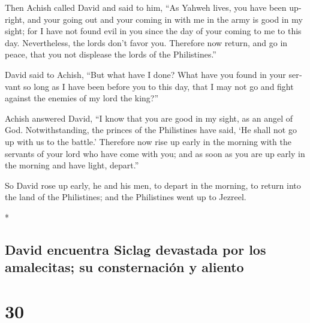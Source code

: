 \begin{paracol}{2}
\begin{otherlanguage}{english}
 Then Achish called David and said to him, ``As Yahweh
lives, you have been upright, and your going out and your coming in with
me in the army is good in my sight; for I have not found evil in you
since the day of your coming to me to this day. Nevertheless, the lords
don't favor you.  Therefore now return, and go in peace,
that you not displease the lords of the Philistines.''

 David said to Achish, ``But what have I done? What have
you found in your servant so long as I have been before you to this day,
that I may not go and fight against the enemies of my lord the king?''

 Achish answered David, ``I know that you are good in my
sight, as an angel of God. Notwithstanding, the princes of the
Philistines have said, `He shall not go up with us to the battle.'
 Therefore now rise up early in the morning with the
servants of your lord who have come with you; and as soon as you are up
early in the morning and have light, depart.''

 So David rose up early, he and his men, to depart in the
morning, to return into the land of the Philistines; and the Philistines
went up to Jezreel.

\end{otherlanguage}

\switchcolumn[0]*

\hypertarget{david-encuentra-siclag-devastada-por-los-amalecitas-su-consternaciuxf3n-y-aliento}{%
\subsection{David encuentra Siclag devastada por los amalecitas; su
consternación y
aliento}\label{david-encuentra-siclag-devastada-por-los-amalecitas-su-consternaciuxf3n-y-aliento}}

\hypertarget{section-58}{%
\section{30}\label{section-58}}


\end{paracol}
